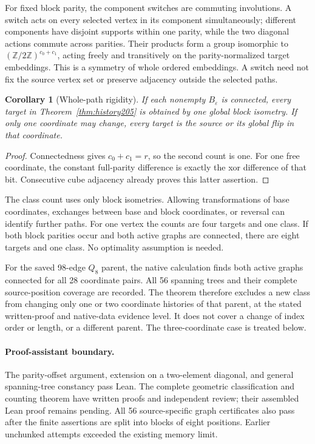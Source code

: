 \documentclass[11pt,a4paper]{article}
\newtheorem{corollary}[theorem]{Corollary}
\theoremstyle{definition}
\theoremstyle{remark}
\begin{document}
For fixed block parity, the component switches are commuting
involutions. A switch acts on every selected vertex in its component
simultaneously; different components have disjoint supports within
one parity, while the two diagonal actions commute across parities.
Their products form a group isomorphic to
$(\mathbb Z/2\mathbb Z)^{c_0+c_1}$, acting freely and transitively
on the parity-normalized target embeddings. This is a symmetry
of whole ordered embeddings. A switch need not fix the source
vertex set or preserve adjacency outside the selected paths.

\begin{corollary}[Whole-path rigidity]
If each nonempty $B_\varepsilon$ is connected, every target in
Theorem~\ref{thm:history205} is obtained by one global block
isometry. If only one coordinate may change, every target is the
source or its global flip in that coordinate.
\end{corollary}
\begin{proof}
Connectedness gives $c_0+c_1=r$, so the second count is one.
For one free coordinate, the constant full-parity difference is
exactly the xor difference of that bit. Consecutive cube adjacency
already proves this latter assertion.
\end{proof}

The class count uses only block isometries. Allowing transformations
of base coordinates, exchanges between base and block coordinates,
or reversal can identify further paths. For one vertex the counts
are four targets and one class. If both block parities occur and
both active graphs are connected, there are eight targets and one
class. No optimality assumption is needed.

For the saved 98-edge $Q_8$ parent, the native calculation finds
both active graphs connected for all 28 coordinate pairs. All 56
spanning trees and their complete source-position coverage are
recorded. The theorem therefore excludes a new class from changing
only one or two coordinate histories of that parent, at the stated
written-proof and native-data evidence level. It does not cover
a change of index order or length, or a different parent. The
three-coordinate case is treated below.

\paragraph{Proof-assistant boundary.}
The parity-offset argument, extension on a two-element diagonal,
and general spanning-tree constancy pass Lean. The complete
geometric classification and counting theorem have written proofs
and independent review; their assembled Lean proof remains pending.
All 56 source-specific graph certificates also pass after the
finite assertions are split into blocks of eight positions. Earlier
unchunked attempts exceeded the existing memory limit.
\end{document}
